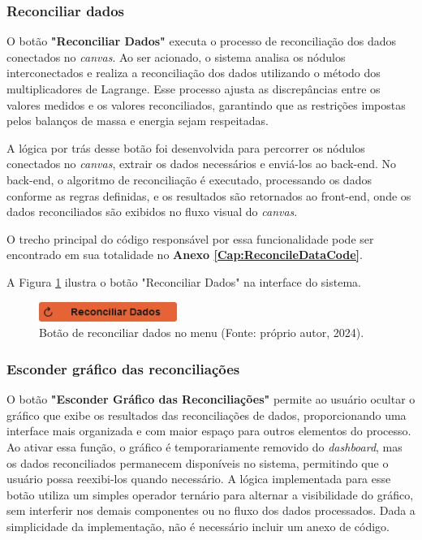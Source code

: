 \subsubsection{Reconciliar dados}

O botão \textbf{"Reconciliar Dados"} executa o processo de reconciliação dos dados conectados no \textit{canvas}. Ao ser acionado, o sistema analisa os nódulos interconectados e realiza a reconciliação dos dados utilizando o método dos multiplicadores de Lagrange. Esse processo ajusta as discrepâncias entre os valores medidos e os valores reconciliados, garantindo que as restrições impostas pelos balanços de massa e energia sejam respeitadas.

A lógica por trás desse botão foi desenvolvida para percorrer os nódulos conectados no \textit{canvas}, extrair os dados necessários e enviá-los ao back-end. No back-end, o algoritmo de reconciliação é executado, processando os dados conforme as regras definidas, e os resultados são retornados ao front-end, onde os dados reconciliados são exibidos no fluxo visual do \textit{canvas}.

O trecho principal do código responsável por essa funcionalidade pode ser encontrado em sua totalidade no \textbf{Anexo \ref{Cap:ReconcileDataCode}}.

A Figura \ref{Fig:ReconcileButton} ilustra o botão "Reconciliar Dados" na interface do sistema.

\begin{figure}[htbp]
    \centering
    \includegraphics[width=0.4\textwidth]{figuras/reconcile-data-button.png}
    \caption{Botão de reconciliar dados no menu (Fonte: próprio autor, 2024).}
    \label{Fig:ReconcileButton}
\end{figure}

\subsubsection{Esconder gráfico das reconciliações}

O botão \textbf{"Esconder Gráfico das Reconciliações"} permite ao usuário ocultar o gráfico que exibe os resultados das reconciliações de dados, proporcionando uma interface mais organizada e com maior espaço para outros elementos do processo. Ao ativar essa função, o gráfico é temporariamente removido do \textit{dashboard}, mas os dados reconciliados permanecem disponíveis no sistema, permitindo que o usuário possa reexibi-los quando necessário. A lógica implementada para esse botão utiliza um simples operador ternário para alternar a visibilidade do gráfico, sem interferir nos demais componentes ou no fluxo dos dados processados. Dada a simplicidade da implementação, não é necessário incluir um anexo de código.

